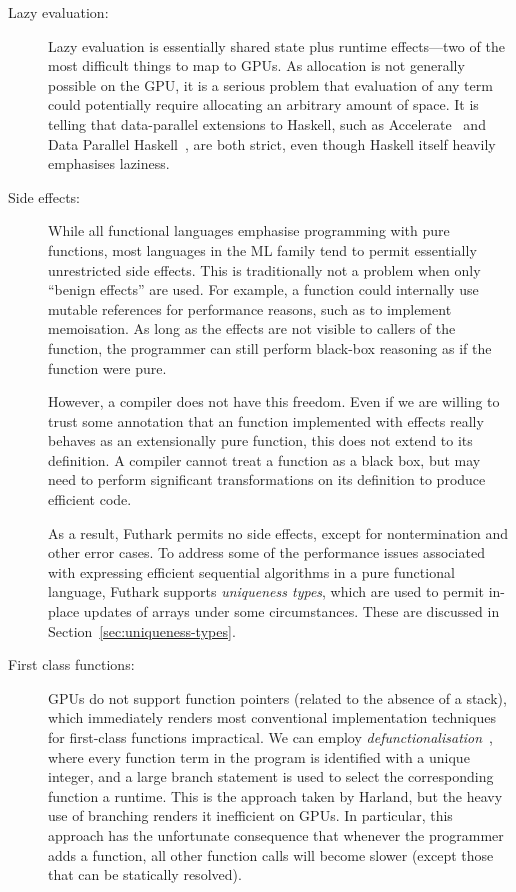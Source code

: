 \begin{description}
\item[Lazy evaluation:] Lazy evaluation is essentially shared state
  plus runtime effects---two of the most difficult things to map to
  GPUs.  As allocation is not generally possible on the GPU, it is a
  serious problem that evaluation of any term could potentially
  require allocating an arbitrary amount of space.  It is telling that
  data-parallel extensions to Haskell, such as
  Accelerate~\cite{mcdonell2013optimising} and Data Parallel
  Haskell~\cite{Chak06DPH}, are both strict, even though Haskell
  itself heavily emphasises laziness.

\item[Side effects:] While all functional languages emphasise
  programming with pure functions, most languages in the ML family
  tend to permit essentially unrestricted side effects.  This is
  traditionally not a problem when only ``benign effects'' are used.
  For example, a function could internally use mutable references for
  performance reasons, such as to implement memoisation.  As long as
  the effects are not visible to callers of the function, the
  programmer can still perform black-box reasoning as if the function
  were pure.

  However, a compiler does not have this freedom.  Even if we are
  willing to trust some annotation that an function implemented with
  effects really behaves as an extensionally pure function, this does
  not extend to its definition.  A compiler cannot treat a function as
  a black box, but may need to perform significant transformations on
  its definition to produce efficient code.

  As a result, Futhark permits no side effects, except for
  nontermination and other error cases.  To address some of the
  performance issues associated with expressing efficient sequential
  algorithms in a pure functional language, Futhark supports
  \textit{uniqueness types}, which are used to permit in-place updates
  of arrays under some circumstances.  These are discussed in
  Section~\ref{sec:uniqueness-types}.

\item[First class functions:] GPUs do not support function pointers
  (related to the absence of a stack), which immediately renders most
  conventional implementation techniques for first-class functions
  impractical.  We can employ
  \textit{defunctionalisation}~\cite{reynolds1972definitional}, where
  every function term in the program is identified with a unique
  integer, and a large branch statement is used to select the
  corresponding function a runtime.  This is the approach taken by
  Harland, but the heavy use of branching renders it inefficient on
  GPUs.  In particular, this approach has the unfortunate consequence
  that whenever the programmer adds a function, all other function
  calls will become slower (except those that can be statically
  resolved).


\end{description}
